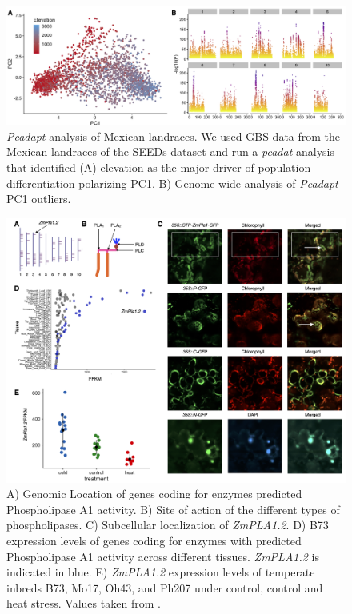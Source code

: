 \documentclass[9pt,twocolumn,twoside]{BioRxiv}
\begin{document}
\begin{figure}[t]
\begin{center}
\includegraphics[width=0.8\paperwidth]{Sup_Figures/Sup_Fig_2.png}
\caption{\textit{Pcadapt} analysis of Mexican landraces. We used GBS data from the Mexican landraces of the SEEDs dataset \cite{Romero_Navarro2017-cn} and run a \textit{pcadat} analysis \cite{Luu2017-ws} that identified (A) elevation as the major driver of population differentiation polarizing PC1.  
B) Genome wide analysis of \textit{Pcadapt} PC1 outliers. 
}
\label{SupFig2}
\end{center}
\end{figure} 

\clearpage

\begin{figure}[t]
\begin{center}
\includegraphics[width=0.8\paperwidth]{Sup_Figures/Sup_Fig_3.png}
\caption{A) Genomic Location of genes coding for enzymes predicted Phospholipase A1 activity. 
B) Site of action of the different types of phospholipases.
C) Subcellular localization of \textit{ZmPLA1.2}.
D) B73 expression levels of genes coding for enzymes with predicted Phospholipase A1 activity across different tissues. \textit{ZmPLA1.2} is indicated in blue. 
E) \textit{ZmPLA1.2} expression levels of temperate inbreds B73, Mo17, Oh43, and Ph207 under control, control and heat stress. Values taken from \cite{Waters2017-nat}. 
}
\label{SupFig4}
\end{center}
\end{figure}  
\end{document}
